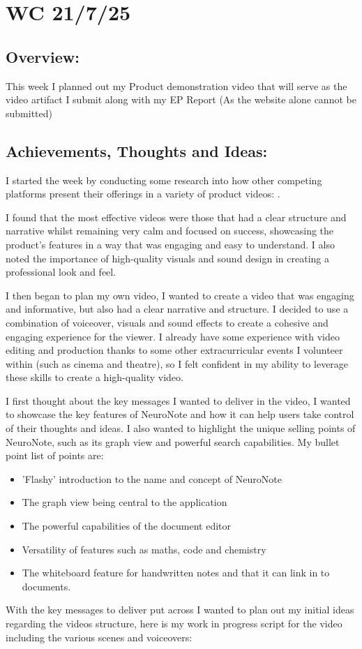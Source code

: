 \section{WC 21/7/25}
\subsection*{Overview:}
This week I planned out my Product demonstration video that will serve as the video artifact I submit along with my EP Report (As the website alone cannot be submitted)

\subsection*{Achievements, Thoughts and Ideas:}
I started the week by conducting some research into how other competing platforms present their offerings in a variety of product videos: .

I found that the most effective videos were those that had a clear structure and narrative whilst remaining very calm and focused on success, showcasing the product's features in a way that was engaging and easy to understand. I also noted the importance of high-quality visuals and sound design in creating a professional look and feel. 

I then began to plan my own video, I wanted to create a video that was engaging and informative, but also had a clear narrative and structure. I decided to use a combination of voiceover, visuals and sound effects to create a cohesive and engaging experience for the viewer. I already have some experience with video editing and production thanks to some other extracurricular events I volunteer within (such as cinema and theatre), so I felt confident in my ability to leverage these skills to create a high-quality video.

I first thought about the key messages I wanted to deliver in the video, I wanted to showcase the key features of NeuroNote and how it can help users take control of their thoughts and ideas. I also wanted to highlight the unique selling points of NeuroNote, such as its graph view and powerful search capabilities. My bullet point list of points are:
\begin{itemize}
    \item 'Flashy' introduction to the name and concept of NeuroNote
    \item The graph view being central to the application
    \item The powerful capabilities of the document editor
    \item Versatility of features such as maths, code and chemistry
    \item The whiteboard feature for handwritten notes and that it can link in to documents.
\end{itemize}
With the key messages to deliver put across I wanted to plan out my initial ideas regarding the videos structure, here is my work in progress script for the video including the various scenes and voiceovers:


